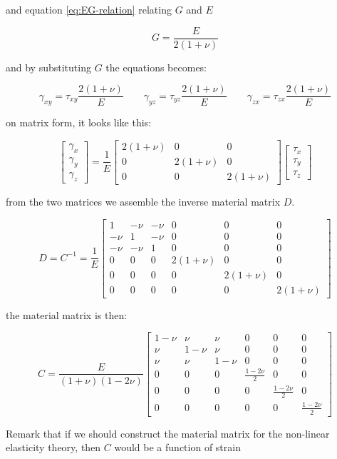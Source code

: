 and equation \eqref{eq:EG-relation} relating
$G$ and $E$

\begin{equation*}
G = \frac{E}{2(1+\nu)}
\end{equation*}

and by substituting $G$ the equations becomes:

\begin{equation}
  \gamma_{xy} = \tau_{xy} \frac{2(1+\nu)}{E}
  \qquad
  \gamma_{yz} = \tau_{yz} \frac{2(1+\nu)}{E}
  \qquad
  \gamma_{zx} = \tau_{zx} \frac{2(1+\nu)}{E}
\end{equation}

on matrix form, it looks like this:

\begin{equation}
\begin{bmatrix}
\gamma_x \\ \gamma_y \\ \gamma_z
\end{bmatrix}
=
\frac{1}{E}
\begin{bmatrix}
  2(1+\nu) & 0 & 0 \\
  0 & 2(1+\nu) & 0 \\
  0 & 0 & 2(1+\nu)
\end{bmatrix}
\begin{bmatrix}
  \tau_x \\ \tau_y \\ \tau_z
\end{bmatrix}
\end{equation}

from the two matrices we assemble the inverse material matrix $D$.

\begin{equation}
\label{eq:D-3d}
D = C^{-1} = \frac{1}{E} 
\begin{bmatrix}
  1 & - \nu & - \nu & 0 & 0 & 0 \\
  - \nu & 1 & - \nu & 0 & 0 & 0 \\
  - \nu & - \nu & 1 & 0 & 0 & 0 \\
  0 & 0 & 0 & 2(1+\nu) & 0 & 0 \\
  0 & 0 & 0 & 0 & 2(1+\nu) & 0 \\
  0 & 0 & 0 & 0 & 0 & 2(1+\nu)
\end{bmatrix}
\end{equation}

the material matrix is then:

\begin{equation}
\label{eq:C-3d}
C = \frac{E}{(1+\nu)(1-2\nu)} 
\begin{bmatrix}
  1-\nu & \nu & \nu & 0 & 0 & 0 \\
  \nu & 1-\nu & \nu & 0 & 0 & 0 \\
  \nu & \nu & 1-\nu & 0 & 0 & 0 \\
  0 & 0 & 0 & \frac{1-2\nu}{2} & 0 & 0 \\
  0 & 0 & 0 & 0 & \frac{1-2\nu}{2} & 0 \\
  0 & 0 & 0 & 0 & 0 & \frac{1-2\nu}{2}
\end{bmatrix}
\end{equation}

Remark that if we should construct the material matrix for the
non-linear elasticity theory, then $C$ would be a function of strain
